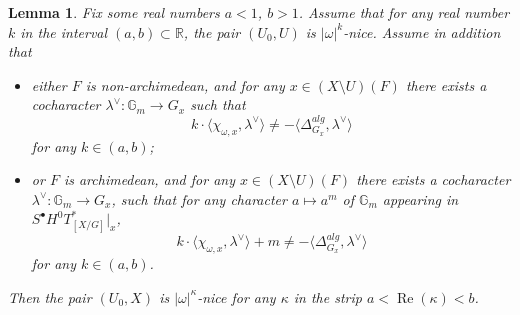 \documentclass[12pt,reqno]{amsart}
\DeclareMathOperator\C{\mathbb C}
\newtheorem{lemma}[theorem]{Lemma}
\theoremstyle{definition}
\theoremstyle{remark}
\numberwithin{equation}{section}
\newcommand{\De}{\Delta}
\newcommand{\ot}{\otimes}
\renewcommand{\SS}{{\mathcal S}}
\newcommand{\sub}{\subset}
\newcommand{\om}{\omega}
\newcommand{\la}{\lambda}
\newcommand{\G}{{\mathbb G}}
\newcommand{\lan}{\langle}
\newcommand{\ran}{\rangle}
\newcommand{\fg}{{\mathfrak g}}
\newcommand{\R}{{\mathbb R}}
\begin{document}
\begin{lemma}\label{extension-lem1}
Fix some real numbers $a<1$, $b>1$.
Assume that for any real number $k$ in the interval $(a,b)\sub \R$, the pair $(U_0,U)$ is $|\om|^k$-nice.
Assume in addition that 
\begin{itemize}
\item either $F$ is non-archimedean, and
for any $x\in (X\setminus U)(F)$ there exists a cocharacter $\la^\vee:\G_m\to G_x$ such that
$$k\cdot\lan \chi_{\om,x},\la^\vee\ran\neq -\lan \De^{alg}_{G_x},\la^\vee\ran$$
for any $k\in (a,b)$;
\item
or $F$ is archimedean, and
for any $x\in (X\setminus U)(F)$ there exists a cocharacter $\la^\vee:\G_m\to G_x$, such that for any character $a\mapsto a^m$ of $\G_m$ appearing in $S^\bullet H^0T^*_{[X/G]}|_x$,
$$k\cdot\lan \chi_{\om,x},\la^\vee\ran+m \neq -\lan \De^{alg}_{G_x},\la^\vee\ran$$
for any $k\in (a,b)$.
\end{itemize}
Then the pair $(U_0,X)$ is $|\om|^{\kappa}$-nice for any $\kappa$ in the strip $a<\operatorname{Re}(\kappa)<b$.
\end{lemma}
\end{document}

